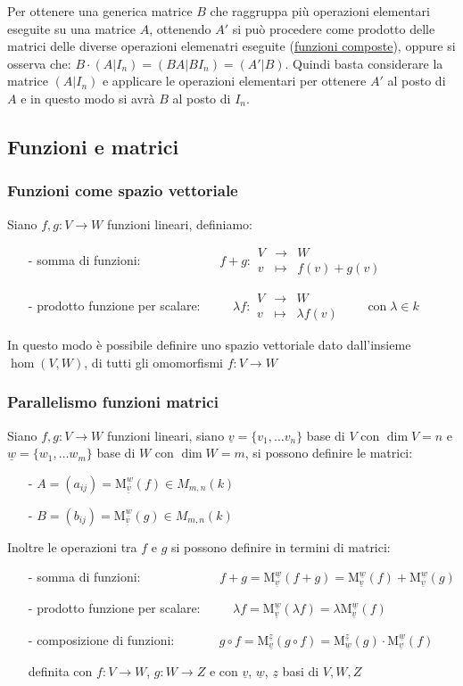 \documentclass[a4paper]{article}
\newcommand\f[4]{\begin{smallmatrix} {#1} &\to &{#2} \\ {#3} &\mapsto &{#4} \end{smallmatrix}}
\newcommand\m[2]{\text{M}_{\underline{#1}}^{\underline{#2}}}
\begin{document}
Per ottenere una generica matrice \(B\) che raggruppa più operazioni elementari eseguite su una matrice \(A\), ottenendo \(A'\)
si può procedere come prodotto delle matrici delle diverse operazioni elemenatri eseguite (\hyperlink{composizioneFunzioniCambiamentiDiBase}{funzioni composte}),
oppure si osserva che: \(B \cdot (A|I_n) = (BA | BI_n) = (A'|B)\). Quindi basta considerare la matrice \((A|I_n)\) e applicare
le operazioni elementari per ottenere \(A'\) al posto di \(A\) e in questo modo si avrà \(B\) al posto di \(I_n\).

\newpage

\subsection{Funzioni e matrici}
\subsubsection*{Funzioni come spazio vettoriale}
Siano \(f, g: V \to W\) funzioni lineari, definiamo:
\begin{itemize}
	\item[-] somma di funzioni: \(\qquad \qquad \qquad f + g: \f{V}{W}{v}{f(v) + g(v)}\)
	\item[-] prodotto funzione per scalare: \(\qquad \; \lambda f: \f{V}{W}{v}{\lambda f(v)} \qquad \text{con} \; \lambda \in k\)
\end{itemize}
In questo modo è possibile definire uno spazio vettoriale dato dall'insieme \(\hom(V,W)\), di tutti gli omomorfismi \(f: V \to W\)

\subsubsection*{Parallelismo funzioni matrici}
Siano \(f, g: V \to W\) funzioni lineari, siano \(\underline{v} = \{ v_1, \dots v_n \}\) base di \(V\) con \(\dim V = n\) e
\(\underline{w} = \{ w_1, \dots w_m \}\) base di \(W\) con \(\dim W = m\), si possono definire le matrici:
\begin{itemize}
	\item[-] \(A = (a_{ij}) = \m{v}{w}(f) \in M_{m,n}(k)\)
	\item[-] \(B = (b_{ij}) = \m{v}{w}(g) \in M_{m,n}(k)\)
\end{itemize}
Inoltre le operazioni tra \(f\) e \(g\) si possono definire in termini di matrici:
\begin{itemize}
	\item[-] somma di funzioni: \(\qquad \qquad \qquad f + g = \m{v}{w}(f + g) = \m{v}{w}(f) + \m{v}{w}(g)\)
	\item[-] prodotto funzione per scalare: \(\qquad \;\lambda f = \m{v}{w}(\lambda f) = \lambda \m{v}{w}(f)\)
	\item[-] composizione di funzioni: \(\qquad \quad \; g \circ f = \m{v}{z}(g \circ f) = \m{w}{z}(g) \cdot \m{v}{w}(f)\)
	\item[] definita con \(f: V \to W\), \(g: W \to Z\) e con \(\underline{v}\), \(\underline{w}\), \(\underline{z}\) basi di \(V, W, Z\)
\end{itemize}
\end{document}
